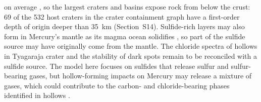 \documentclass[article,review]{planetary}
\begin{document}
on average \parencite{padovan2015}, so the largest craters and basins expose rock from below the crust: 69 of the 532 host craters in the crater containment graph have a first-order depth of origin deeper than 35~km (Section~S14). Sulfide-rich layers may also form in Mercury's mantle as its magma ocean solidifies \parencite{boukare2019}, so part of the sulfide source may have originally come from the mantle. The chloride spectra of hollows in Tyagaraja crater \parencite{lucchetti2021} and the stability of dark spots \parencite{wang2022} remain to be reconciled with a sulfide source. The model here focuses on sulfides that release sulfur and sulfur-bearing gases, but hollow-forming impacts on Mercury may release a mixture of gases, which could contribute to the carbon- and chloride-bearing phases identified in hollows \parencite{emran2025,lucchetti2021}.
\end{document}
